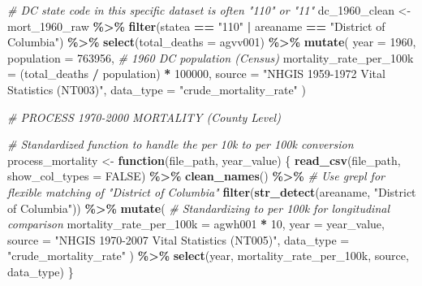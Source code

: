 \documentclass[
]{article}
\newenvironment{Shaded}{\begin{snugshade}}{\end{snugshade}}
\newcommand{\AttributeTok}[1]{\textcolor[rgb]{0.13,0.29,0.53}{#1}}
\newcommand{\CommentTok}[1]{\textcolor[rgb]{0.56,0.35,0.01}{\textit{#1}}}
\newcommand{\ConstantTok}[1]{\textcolor[rgb]{0.56,0.35,0.01}{#1}}
\newcommand{\ControlFlowTok}[1]{\textcolor[rgb]{0.13,0.29,0.53}{\textbf{#1}}}
\newcommand{\DecValTok}[1]{\textcolor[rgb]{0.00,0.00,0.81}{#1}}
\newcommand{\FunctionTok}[1]{\textcolor[rgb]{0.13,0.29,0.53}{\textbf{#1}}}
\newcommand{\NormalTok}[1]{#1}
\newcommand{\OtherTok}[1]{\textcolor[rgb]{0.56,0.35,0.01}{#1}}
\newcommand{\SpecialCharTok}[1]{\textcolor[rgb]{0.81,0.36,0.00}{\textbf{#1}}}
\newcommand{\StringTok}[1]{\textcolor[rgb]{0.31,0.60,0.02}{#1}}
\begin{document}
\begin{Shaded}
\begin{Highlighting}[]
\CommentTok{\# DC state code in this specific dataset is often "110" or "11"}
\NormalTok{dc\_1960\_clean }\OtherTok{\textless{}{-}}\NormalTok{ mort\_1960\_raw }\SpecialCharTok{\%\textgreater{}\%}
  \FunctionTok{filter}\NormalTok{(statea }\SpecialCharTok{==} \StringTok{"110"} \SpecialCharTok{|}\NormalTok{ areaname }\SpecialCharTok{==} \StringTok{"District of Columbia"}\NormalTok{) }\SpecialCharTok{\%\textgreater{}\%}
  \FunctionTok{select}\NormalTok{(}\AttributeTok{total\_deaths =}\NormalTok{ agvv001) }\SpecialCharTok{\%\textgreater{}\%}
  \FunctionTok{mutate}\NormalTok{(}
    \AttributeTok{year =} \DecValTok{1960}\NormalTok{,}
    \AttributeTok{population =} \DecValTok{763956}\NormalTok{, }\CommentTok{\# 1960 DC population (Census)}
    \AttributeTok{mortality\_rate\_per\_100k =}\NormalTok{ (total\_deaths }\SpecialCharTok{/}\NormalTok{ population) }\SpecialCharTok{*} \DecValTok{100000}\NormalTok{,}
    \AttributeTok{source =} \StringTok{"NHGIS 1959{-}1972 Vital Statistics (NT003)"}\NormalTok{,}
    \AttributeTok{data\_type =} \StringTok{"crude\_mortality\_rate"}
\NormalTok{  )}


\CommentTok{\#  PROCESS 1970{-}2000 MORTALITY (County Level)}

\CommentTok{\# Standardized function to handle the per 10k to per 100k conversion}
\NormalTok{process\_mortality }\OtherTok{\textless{}{-}} \ControlFlowTok{function}\NormalTok{(file\_path, year\_value) \{}
  \FunctionTok{read\_csv}\NormalTok{(file\_path, }\AttributeTok{show\_col\_types =} \ConstantTok{FALSE}\NormalTok{) }\SpecialCharTok{\%\textgreater{}\%}
    \FunctionTok{clean\_names}\NormalTok{() }\SpecialCharTok{\%\textgreater{}\%}
    \CommentTok{\# Use grepl for flexible matching of "District of Columbia"}
    \FunctionTok{filter}\NormalTok{(}\FunctionTok{str\_detect}\NormalTok{(areaname, }\StringTok{"District of Columbia"}\NormalTok{)) }\SpecialCharTok{\%\textgreater{}\%}
    \FunctionTok{mutate}\NormalTok{(}
      \CommentTok{\# Standardizing to per 100k for longitudinal comparison}
      \AttributeTok{mortality\_rate\_per\_100k =}\NormalTok{ agwh001 }\SpecialCharTok{*} \DecValTok{10}\NormalTok{, }
      \AttributeTok{year =}\NormalTok{ year\_value,}
      \AttributeTok{source =} \StringTok{"NHGIS 1970{-}2007 Vital Statistics (NT005)"}\NormalTok{,}
      \AttributeTok{data\_type =} \StringTok{"crude\_mortality\_rate"}
\NormalTok{    ) }\SpecialCharTok{\%\textgreater{}\%}
    \FunctionTok{select}\NormalTok{(year, mortality\_rate\_per\_100k, source, data\_type)}
\NormalTok{\}}


\end{Highlighting}
\end{Shaded}
\end{document}

